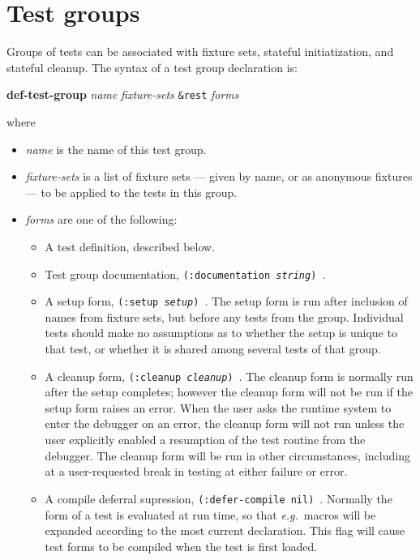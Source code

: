 \documentclass{article}
\begin{document}
\section{Test groups}
Groups of tests can be
associated with fixture sets, stateful initiatization, and stateful
cleanup.  The syntax of a test group declaration
is:
\begin{center}
\textbf{def-test-group} \textit{name}
 \textit{fixture-sets} \texttt{\&rest} \textit{forms}
\end{center}
where
\begin{itemize}
\item\textit{name} is the name of this test group.
\item\textit{fixture-sets} is a list of fixture sets --- given by
  name, or as anonymous fixtures --- to be applied to the tests in
  this group.
\item\textit{forms} are one of the following:
\begin{itemize}
\item A test definition, described below.
\item Test group documentation, \texttt{(:documentation
    \textit{string})}~.
\item A setup form, \texttt{(:setup
    \textit{setup})}~.  The setup form is
  run after inclusion of names from fixture sets, but before any tests
  from the group.  Individual tests should make no assumptions as to
  whether the setup is unique to that test, or whether it is shared
  among several tests of that group.
\item A cleanup form, \texttt{(:cleanup
    \textit{cleanup})}~.  The
  cleanup form is normally run after the setup completes; however the
  cleanup form will not be run if the setup form raises an error.
  When the user asks the runtime system to enter the debugger on an
  error, the cleanup form will not run unless the user explicitly
  enabled a resumption of the test routine from the debugger.  The
  cleanup form will be run in other circumstances, including at a
  user-requested break in testing at either failure or error.
\item A compile deferral supression, \texttt{(:defer-compile
    nil)}~.  Normally the
  form of a test is evaluated at run time, so that \emph{e.g.}\ macros
  will be expanded according to the most current declaration.  This
  flag will cause test forms to be compiled when the test is first
  loaded.
\end{itemize}
\end{itemize}
\end{document}
